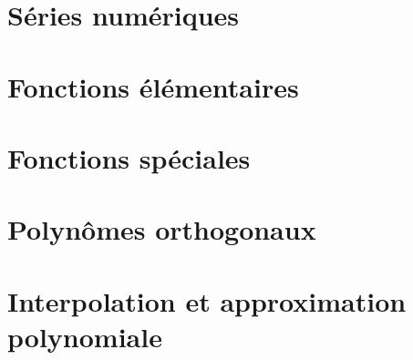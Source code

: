 \documentclass[a4paper,11pt]{book}
\begin{document}
\chapter{Séries numériques}


\clearpage


\clearpage


\clearpage

\chapter{Fonctions élémentaires}


\clearpage


\clearpage


\clearpage

\chapter{Fonctions spéciales}


\clearpage


\clearpage


\clearpage

\chapter{Polynômes orthogonaux}


\clearpage


\clearpage


\clearpage


\clearpage


\clearpage

\chapter{Interpolation et approximation polynomiale}


\clearpage


\clearpage


\clearpage
\end{document}
